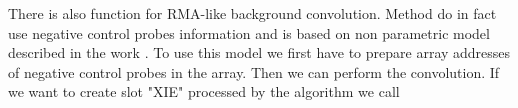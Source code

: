 There is also function for RMA-like background convolution. Method  do in fact use negative control probes information and is based on non parametric model described in the work \cite{xie_statistical_2009}. To use this model we first have to prepare array addresses of negative control probes in the array. Then we can perform the convolution. If we want to create slot "XIE" processed by the algorithm we call